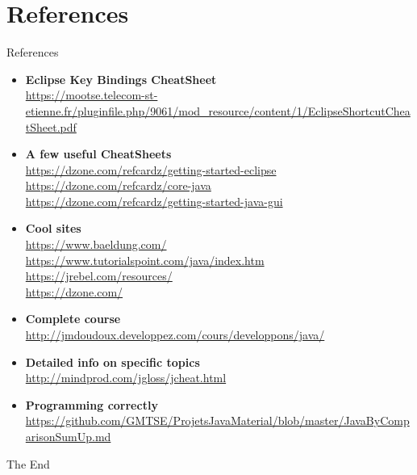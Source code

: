 \documentclass[English,c,%
hyperref={%
    pdftitle={FISA-DE2 OOP in Java},%
    pdfauthor={Muller, Gravier, Laforest, Subercaze},%
    pdfsubject={OOP in Java},%
    pdfkeywords={OOP, Java}%
    },%
xcolor={pdftex,svgnames} %
]{beamer}
\begin{document}
\section*{References}

\begin{frame}{References}


{\tiny
\begin{itemize}

  \item \textbf{Eclipse Key Bindings CheatSheet}\\
  \url{https://mootse.telecom-st-etienne.fr/pluginfile.php/9061/mod_resource/content/1/EclipseShortcutCheatSheet.pdf}

  \item \textbf{A few useful CheatSheets}\\
  \url{https://dzone.com/refcardz/getting-started-eclipse}\\
  \url{https://dzone.com/refcardz/core-java}\\
  \url{https://dzone.com/refcardz/getting-started-java-gui}

  \item \textbf{Cool sites}\\
  \url{https://www.baeldung.com/}\\
  \url{https://www.tutorialspoint.com/java/index.htm}\\
  \url{https://jrebel.com/resources/}\\
  \url{https://dzone.com/}\\

  \item \textbf{Complete course}\\
  \url{http://jmdoudoux.developpez.com/cours/developpons/java/}

  \item \textbf{Detailed info on specific topics}\\
  \url{http://mindprod.com/jgloss/jcheat.html}

  \item \textbf{Programming correctly}\\
  \url{https://github.com/GMTSE/ProjetsJavaMaterial/blob/master/JavaByComparisonSumUp.md}

\end{itemize}

}

\end{frame}



\begin{frame}
\centerline{The End}
\end{frame}
\end{document}

